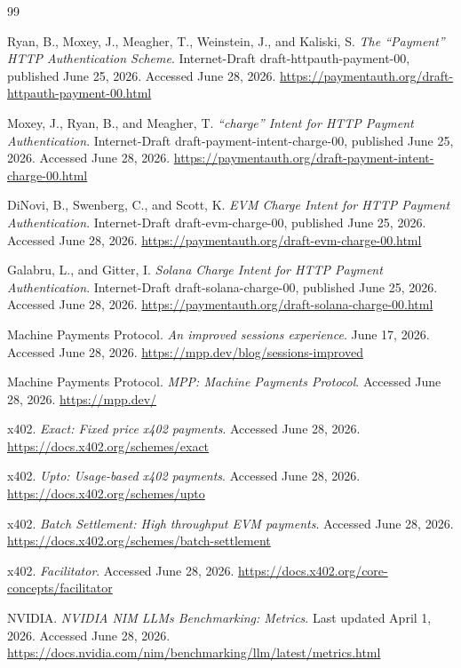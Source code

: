 \documentclass[11pt]{article}
\begin{document}
\begin{thebibliography}{99}

Ryan, B., Moxey, J., Meagher, T., Weinstein, J., and Kaliski, S.
\textit{The ``Payment'' HTTP Authentication Scheme}.
Internet-Draft draft-httpauth-payment-00, published June 25, 2026. Accessed June 28, 2026.
\url{https://paymentauth.org/draft-httpauth-payment-00.html}

Moxey, J., Ryan, B., and Meagher, T.
\textit{``charge'' Intent for HTTP Payment Authentication}.
Internet-Draft draft-payment-intent-charge-00, published June 25, 2026. Accessed June 28, 2026.
\url{https://paymentauth.org/draft-payment-intent-charge-00.html}

DiNovi, B., Swenberg, C., and Scott, K.
\textit{EVM Charge Intent for HTTP Payment Authentication}.
Internet-Draft draft-evm-charge-00, published June 25, 2026. Accessed June 28, 2026.
\url{https://paymentauth.org/draft-evm-charge-00.html}

Galabru, L., and Gitter, I.
\textit{Solana Charge Intent for HTTP Payment Authentication}.
Internet-Draft draft-solana-charge-00, published June 25, 2026. Accessed June 28, 2026.
\url{https://paymentauth.org/draft-solana-charge-00.html}

Machine Payments Protocol.
\textit{An improved sessions experience}.
June 17, 2026. Accessed June 28, 2026.
\url{https://mpp.dev/blog/sessions-improved}

Machine Payments Protocol.
\textit{MPP: Machine Payments Protocol}.
Accessed June 28, 2026.
\url{https://mpp.dev/}

x402.
\textit{Exact: Fixed price x402 payments}.
Accessed June 28, 2026.
\url{https://docs.x402.org/schemes/exact}

x402.
\textit{Upto: Usage-based x402 payments}.
Accessed June 28, 2026.
\url{https://docs.x402.org/schemes/upto}

x402.
\textit{Batch Settlement: High throughput EVM payments}.
Accessed June 28, 2026.
\url{https://docs.x402.org/schemes/batch-settlement}

x402.
\textit{Facilitator}.
Accessed June 28, 2026.
\url{https://docs.x402.org/core-concepts/facilitator}

NVIDIA.
\textit{NVIDIA NIM LLMs Benchmarking: Metrics}.
Last updated April 1, 2026. Accessed June 28, 2026.
\url{https://docs.nvidia.com/nim/benchmarking/llm/latest/metrics.html}


\end{thebibliography}
\end{document}
